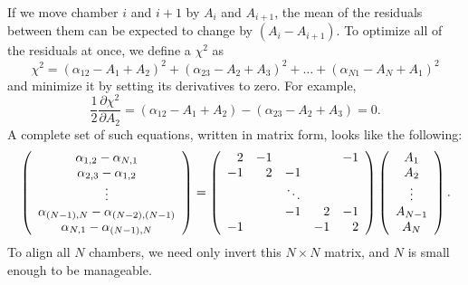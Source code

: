 If we move chamber $i$ and $i+1$ by $A_i$ and $A_{i+1}$, the mean of
the residuals between them can be expected to change by $(A_i -
A_{i+1})$.  To optimize all of the residuals at once, we define a
$\chi^2$ as
\begin{equation}
\chi^2 = (\alpha_{12} - A_1 + A_2)^2 + (\alpha_{23} - A_2 + A_3)^2 + \ldots + (\alpha_{N1} - A_N + A_1)^2
\end{equation}
and minimize it by setting its derivatives to zero.  For example,
\begin{equation}
\frac{1}{2} \frac{\partial \chi^2}{\partial A_2} = (\alpha_{12} - A_1 + A_2) - (\alpha_{23} - A_2 + A_3) = 0 \mbox{.}
\end{equation}
A complete set of such equations, written in matrix form, looks like
the following:
\begin{equation}
\left(\begin{array}{c}
\alpha_{1,2} - \alpha_{N,1} \\
\alpha_{2,3} - \alpha_{1,2} \\
\vdots \\
\alpha_{(N-1),N} - \alpha_{(N-2),(N-1)} \\
\alpha_{N,1} - \alpha_{(N-1),N}
\end{array} \right)
=
\left(\begin{array}{r r r r r}
2 & -1 &  &  & -1 \\
-1 & 2 & -1 &  &  \\
 &  & \ddots & &  \\
 &  & -1 & 2 & -1 \\
-1 &  &  & -1 & 2
\end{array}\right)
\left(\begin{array}{c}
A_1 \\
A_2 \\
\vdots \\
A_{N-1} \\
A_N \\
\end{array} \right)\mbox{.}
\label{eqn:NbyNmatrix}
\end{equation}
To align all $N$ chambers, we need only invert this $N\times N$
matrix, and $N$ is small enough to be manageable.

